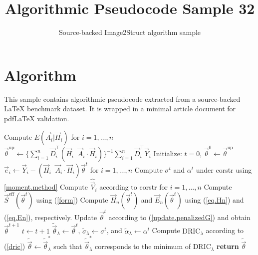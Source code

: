 \documentclass[11pt]{article}
\title{Algorithmic Pseudocode Sample 32}
\author{Source-backed Image2Struct algorithm sample}
\date{}
\begin{document}
\maketitle
\section{Algorithm}
This sample contains algorithmic pseudocode extracted from a source-backed LaTeX benchmark dataset. It is wrapped in a minimal article document for pdfLaTeX validation.

\begin{algorithm}[htbp]
\caption{Source-backed algorithmic procedure}
\begin{algorithmic}[1]
\State Compute $E(\vec A_i|\vec H_i)$ for $i=1,\ldots,n$ 
\State $\vec\theta^{\text{up}} \gets \{\sum_{i=1}^n\vec D_i^\top(\vec H_i\;\;\vec A_i\cdot\vec H_i)\}^{-1}\sum_{i=1}^n\vec D_i^\top \vec Y_i$ 
\State Initialize: $t = 0$, $\vec\theta^0 \gets \vec\theta^{\text{up}}$
\Repeat
\State $\vec e_i \gets \vec Y_i - (\vec H_i\;\;\vec A_i\cdot\vec H_i)\vec\theta^t$ for $i=1,\ldots,n$%
\State Compute $\sigma^t$ and $\alpha^t$ under corstr using \ref{moment.method} 
\State Compute $\hat{\vec V}_i$ according to corstr for $i=1,\ldots,n$ 
\State Compute $\vec S^{\text{eff}}(\vec\theta^t)$ using (\ref{form})
\State Compute $\vec H_n(\vec\theta^t)$ and $\vec E_n(\vec\theta^t)$ using (\ref{eq.Hn}) and (\ref{eq.En}), respectively.
\State Update $\vec\theta^{t}$ according to (\ref{update.penalizedG}) and obtain $\vec\theta^{t+1}$
\State $t \gets t+1$
\State $\tilde{\vec\theta}_\lambda \gets \vec\theta^t$, $\tilde{\sigma}_\lambda \gets \sigma^t$, and $\tilde{\alpha}_\lambda \gets \alpha^t$
\State Compute $\text{DRIC}_{\lambda}$ according to (\ref{dric})
\EndFor
\State $\tilde{\vec\theta} \gets \tilde{\vec\theta}_\lambda^*$ such that $\tilde{\vec\theta}_\lambda^*$ corresponds to the minimum of $\text{DRIC}_{\lambda}$
\State \textbf{return} $\tilde{\vec\theta}$
\EndProcedure
\end{algorithmic}
\end{algorithm}
\end{document}
